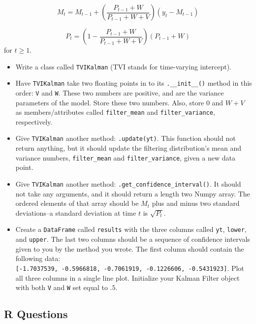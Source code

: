 \documentclass[
  12pt,
  krantz2]{krantz}
\providecommand{\tightlist}{%
  \setlength{\itemsep}{0pt}\setlength{\parskip}{0pt}}
\begin{document}
\begin{equation} 
M_t = M_{t-1} + \left(\frac{P_{t-1} + W}{P_{t-1} + W+V} \right)(y_t - M_{t-1}) 
\end{equation}

\begin{equation} 
P_t = \left(1 - \frac{P_{t-1} + W}{P_{t-1} + W+V} \right)(P_{t-1} + W)
\end{equation}
for \(t \ge 1\).

\begin{itemize}
\tightlist
\item
  Write a class called \texttt{TVIKalman} (TVI stands for time-varying intercept).
\item
  Have \texttt{TVIKalman} take two floating points in to its \texttt{.\_\_init\_\_()} method in this order: \texttt{V} and \texttt{W}. These two numbers are positive, and are the variance parameters of the model. Store these two numbers. Also, store \(0\) and \(W+V\) as members/attributes called \texttt{filter\_mean} and \texttt{filter\_variance}, respectively.
\item
  Give \texttt{TVIKalman} another method: \texttt{.update(yt)}. This function should not return anything, but it should update the filtering distribution's mean and variance numbers, \texttt{filter\_mean} and \texttt{filter\_variance}, given a new data point.
\item
  Give \texttt{TVIKalman} another method: \texttt{.get\_confidence\_interval()}. It should not take any arguments, and it should return a length two Numpy array. The ordered elements of that array should be \(M_t\) plus and minus two standard deviations--a standard deviation at time \(t\) is \(\sqrt{P_t}\).
\item
  Create a \texttt{DataFrame} called \texttt{results} with the three columns called \texttt{yt}, \texttt{lower}, and \texttt{upper}. The last two columns should be a sequence of confidence intervals given to you by the method you wrote. The first column should contain the following data: \texttt{{[}-1.7037539,\ -0.5966818,\ -0.7061919,\ -0.1226606,\ -0.5431923{]}}. Plot all three columns in a single line plot. Initialize your Kalman Filter object with both \texttt{V} and \texttt{W} set equal to \(.5\).
\end{itemize}

\hypertarget{r-questions-10}{%
\subsection{R Questions}\label{r-questions-10}}
\end{document}
